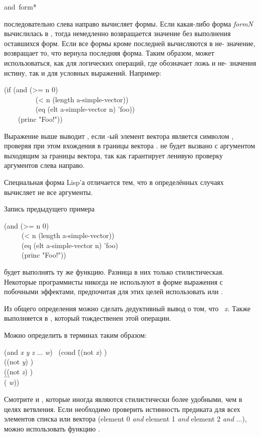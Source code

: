 \begin{defmac}
and {\,form}*

 последовательно слева направо
вычисляет формы. Если какая-либо форма \emph{formN} вычислилась в {\false},
тогда немедленно возвращается значение {\nil} без выполнения оставшихся форм. Если все
формы кроме последней вычисляются в не-{\false} значение,  возвращает
то, что вернула последняя форма.
Таким образом,  может использоваться, как для логических операций, где
{\false} обозначает ложь и не-{\false} значения истину, так и для условных
выражений.
Например:
\begin{lisp}
(if (and (>= n 0) \\
~~~~~~~~~(< n (length a-simple-vector)) \\
~~~~~~~~~(eq (elt a-simple-vector n) 'foo)) \\
~~~~(princ "Foo!"))
\end{lisp}
Выражение выше выводит , если -ый элемент вектора
 является символом , проверяя при этом вхождения
 в границы вектора .  не будет вызвано с
аргументом  выходящим за границы вектора, так как  гарантирует
ленивую проверку аргументов слева направо.

Специальная форма Lisp'а  отличается тем, что в определённых случаях
вычисляет не все аргументы.

Запись предыдущего примера
\begin{lisp}
(and (>= n 0) \\
~~~~~(< n (length a-simple-vector)) \\
~~~~~(eq (elt a-simple-vector n) 'foo) \\
~~~~~(princ "Foo!"))
\end{lisp}
будет выполнять ту же функцию. Разница в них только стилистическая. Некоторые
программисты никогда не используют в форме  выражения с побочными
эффектами, предпочитая для этих целей использовать  или . 

Из общего определения можно сделать дедуктивный вывод о том, что 
 \EQ\ \emph{x}. Также  выполняется в {\true},
который тождественен этой операции.

Можно определить  в терминах  таким образом:
\begin{lisp}
(and \emph{x} \emph{y} \emph{z} ... \emph{w}) \EQ\ (cond \=((not \emph{x}) {\false}) \\
\>((not \emph{y}) {\false}) \\
\>((not \emph{z}) {\false}) \\
\>$\ldots$ \\
\>({\true} \emph{w}))
\end{lisp}

Смотрите  и , которые иногда являются стилистически более
удобными, чем  в целях ветвления.
Если необходимо проверить истинность предиката для всех элементов списка или
вектора (element 0 \emph{and} element 1 \emph{and}
element 2 \emph{and} $\ldots$), можно использовать функцию .
\end{defmac}

